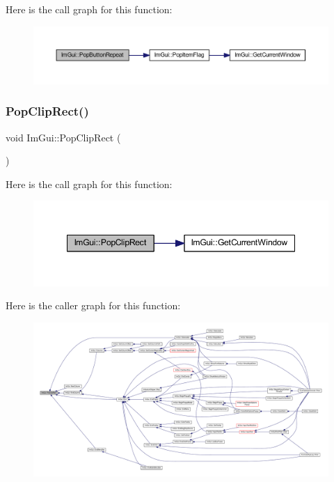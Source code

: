 Here is the call graph for this function\+:
\nopagebreak
\begin{figure}[H]
\begin{center}
\leavevmode
\includegraphics[width=350pt]{namespace_im_gui_a0f883e8507be797ca8ba1448d2b9dbb0_cgraph}
\end{center}
\end{figure}
\mbox{\label{namespace_im_gui_aef1c8a6e5a3c70cb10d03d2a2a66dfd8}} 
\subsubsection{\texorpdfstring{Pop\+Clip\+Rect()}{PopClipRect()}}
{\footnotesize\ttfamily void Im\+Gui\+::\+Pop\+Clip\+Rect (\begin{DoxyParamCaption}{ }\end{DoxyParamCaption})}

Here is the call graph for this function\+:
\nopagebreak
\begin{figure}[H]
\begin{center}
\leavevmode
\includegraphics[width=348pt]{namespace_im_gui_aef1c8a6e5a3c70cb10d03d2a2a66dfd8_cgraph}
\end{center}
\end{figure}
Here is the caller graph for this function\+:
\nopagebreak
\begin{figure}[H]
\begin{center}
\leavevmode
\includegraphics[width=350pt]{namespace_im_gui_aef1c8a6e5a3c70cb10d03d2a2a66dfd8_icgraph}
\end{center}
\end{figure}
\mbox{\label{namespace_im_gui_af66649bc37022bf3cf2496c73af9a499}} 
